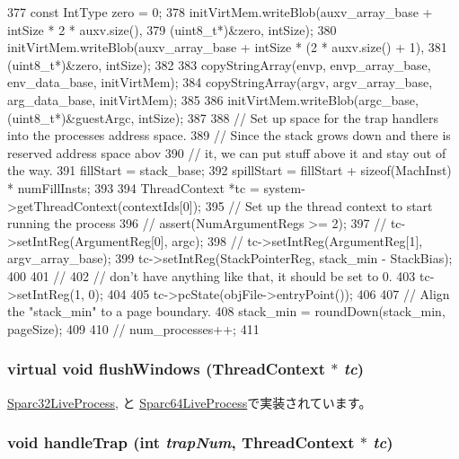 \begin{DoxyCode}
{377     const IntType zero = 0;
378     initVirtMem.writeBlob(auxv_array_base + intSize * 2 * auxv.size(),
379             (uint8_t*)&zero, intSize);
380     initVirtMem.writeBlob(auxv_array_base + intSize * (2 * auxv.size() + 1),
381             (uint8_t*)&zero, intSize);
382 
383     copyStringArray(envp, envp_array_base, env_data_base, initVirtMem);
384     copyStringArray(argv, argv_array_base, arg_data_base, initVirtMem);
385 
386     initVirtMem.writeBlob(argc_base, (uint8_t*)&guestArgc, intSize);
387 
388     // Set up space for the trap handlers into the processes address space.
389     // Since the stack grows down and there is reserved address space abov
390     // it, we can put stuff above it and stay out of the way.
391     fillStart = stack_base;
392     spillStart = fillStart + sizeof(MachInst) * numFillInsts;
393 
394     ThreadContext *tc = system->getThreadContext(contextIds[0]);
395     // Set up the thread context to start running the process
396     // assert(NumArgumentRegs >= 2);
397     // tc->setIntReg(ArgumentReg[0], argc);
398     // tc->setIntReg(ArgumentReg[1], argv_array_base);
399     tc->setIntReg(StackPointerReg, stack_min - StackBias);
400 
401     // %
402     // don't have anything like that, it should be set to 0.
403     tc->setIntReg(1, 0);
404 
405     tc->pcState(objFile->entryPoint());
406 
407     // Align the "stack_min" to a page boundary.
408     stack_min = roundDown(stack_min, pageSize);
409 
410 //    num_processes++;
411 }
\end{DoxyCode}
\hypertarget{classSparcLiveProcess_ab39e13308fa993d443b20e56572106f5}{
\subsubsection[{flushWindows}]{\setlength{\rightskip}{0pt plus 5cm}virtual void flushWindows ({\bf ThreadContext} $\ast$ {\em tc})}}
\label{classSparcLiveProcess_ab39e13308fa993d443b20e56572106f5}


\hyperlink{classSparc32LiveProcess_ac36137c98f2b65736e0c5745c3c90c85}{Sparc32LiveProcess}, と \hyperlink{classSparc64LiveProcess_ac36137c98f2b65736e0c5745c3c90c85}{Sparc64LiveProcess}で実装されています。\hypertarget{classSparcLiveProcess_a7737d67ba76be0bd3beb0bd0dc93333a}{
\subsubsection[{handleTrap}]{\setlength{\rightskip}{0pt plus 5cm}void handleTrap (int {\em trapNum}, \/  {\bf ThreadContext} $\ast$ {\em tc})}}
\label{classSparcLiveProcess_a7737d67ba76be0bd3beb0bd0dc93333a}


